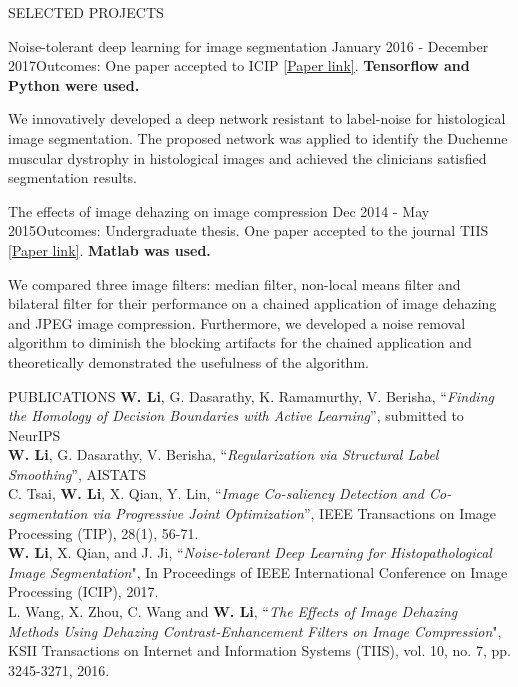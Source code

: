 \documentclass{resume} %
\begin{document}
\begin{rSection}{SELECTED PROJECTS}
\begin{rSubsection}{Noise-tolerant deep learning for image segmentation} {January 2016 - December 2017}{Outcomes: One paper accepted to ICIP \href{https://ieeexplore.ieee.org/stamp/stamp.jsp?tp=&arnumber=8296848}{[Paper link]}. \textbf{Tensorflow and Python were used.}}{}
\item We innovatively developed a deep network resistant to label-noise for histological image segmentation. The proposed network was applied to identify the Duchenne muscular dystrophy in histological images and achieved the clinicians satisfied segmentation results.
\end{rSubsection}  
\vspace{-0.1cm}
\begin{rSubsection}{The effects of image dehazing on image compression} {Dec 2014 - May 2015}{Outcomes: Undergraduate thesis. One paper accepted to the journal TIIS \href{http://www.itiis.org/digital-library/manuscript/1403}{[Paper link]}. \textbf{Matlab was used.}}{}
\item  We compared three image filters: median filter,  non-local means filter and bilateral filter for their performance on a chained application of image dehazing and JPEG image compression. Furthermore, we developed a noise removal algorithm to diminish the blocking artifacts for the chained application and theoretically demonstrated the usefulness of the algorithm.
\end{rSubsection}  
\vspace{-0.1cm}
\end{rSection} 
\vspace{-0.1cm}
\newpage
\begin{rSection}{PUBLICATIONS} \itemsep -3pt  
 \textbf{W. Li}, G. Dasarathy, K. Ramamurthy, V. Berisha, ``\textit{Finding the Homology of Decision Boundaries with Active Learning}'',  submitted to NeurIPS\vspace{+5pt}\\
 \textbf{W. Li}, G. Dasarathy, V. Berisha, ``\textit{Regularization via Structural Label Smoothing}'',  AISTATS\vspace{+5pt}\\
C. Tsai, \textbf{W. Li}, X. Qian, Y. Lin, ``\textit{Image Co-saliency Detection and Co-segmentation via Progressive Joint Optimization}'', IEEE Transactions on Image Processing ({TIP}), 28(1), 56-71. \vspace{+5pt}\\
\textbf{W. Li}, X. Qian, and J. Ji, ``\textit{Noise-tolerant Deep Learning for Histopathological Image Segmentation}", In Proceedings of IEEE International Conference on Image Processing ({ICIP}), 2017.\vspace{+5pt}\\
L. Wang, X. Zhou, C. Wang and \textbf{W. Li}, ``\textit{The Effects of Image Dehazing Methods Using Dehazing Contrast-Enhancement Filters on Image Compression}", KSII Transactions on Internet and Information Systems ({TIIS}), vol. 10, no. 7, pp. 3245-3271, 2016. 
\end{rSection}  
\end{document}

